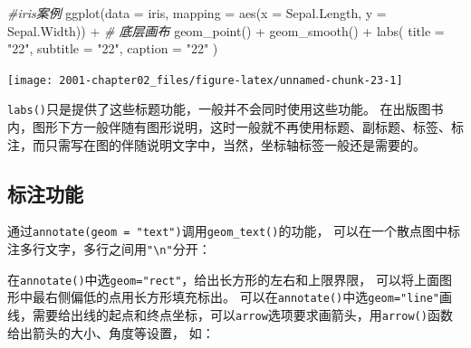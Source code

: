 \documentclass[
]{book}
\newenvironment{Shaded}{\begin{snugshade}}{\end{snugshade}}
\newcommand{\AttributeTok}[1]{\textcolor[rgb]{0.77,0.63,0.00}{#1}}
\newcommand{\CommentTok}[1]{\textcolor[rgb]{0.56,0.35,0.01}{\textit{#1}}}
\newcommand{\FunctionTok}[1]{\textcolor[rgb]{0.00,0.00,0.00}{#1}}
\newcommand{\NormalTok}[1]{#1}
\newcommand{\SpecialCharTok}[1]{\textcolor[rgb]{0.00,0.00,0.00}{#1}}
\newcommand{\StringTok}[1]{\textcolor[rgb]{0.31,0.60,0.02}{#1}}
\begin{document}
\begin{Shaded}
\begin{Highlighting}[]
\CommentTok{\#iris案例}
\FunctionTok{ggplot}\NormalTok{(}\AttributeTok{data =}\NormalTok{ iris, }\AttributeTok{mapping =} \FunctionTok{aes}\NormalTok{(}\AttributeTok{x =}\NormalTok{ Sepal.Length, }\AttributeTok{y =}\NormalTok{ Sepal.Width)) }\SpecialCharTok{+}  \CommentTok{\# 底层画布}
  \FunctionTok{geom\_point}\NormalTok{() }\SpecialCharTok{+}
  \FunctionTok{geom\_smooth}\NormalTok{() }\SpecialCharTok{+}
  \FunctionTok{labs}\NormalTok{(}
    \AttributeTok{title =} \StringTok{"22"}\NormalTok{,}
    \AttributeTok{subtitle =} \StringTok{"22"}\NormalTok{,}
    \AttributeTok{caption =} \StringTok{"22"}
\NormalTok{  )}
\end{Highlighting}
\end{Shaded}

\begin{center}\texttt{[image: 2001-chapter02\_files/figure-latex/unnamed-chunk-23-1]} \end{center}

\texttt{labs()}只是提供了这些标题功能，一般并不会同时使用这些功能。
在出版图书内，图形下方一般伴随有图形说明，这时一般就不再使用标题、副标题、标签、标注，而只需写在图的伴随说明文字中，当然，坐标轴标签一般还是需要的。

\hypertarget{ux6807ux6ce8ux529fux80fd}{%
\subsection{标注功能}\label{ux6807ux6ce8ux529fux80fd}}

通过\texttt{annotate(geom\ =\ "text")}调用\texttt{geom\_text()}的功能，
可以在一个散点图中标注多行文字，多行之间用\texttt{"\textbackslash{}n"}分开：

在\texttt{annotate()}中选\texttt{geom="rect"}，给出长方形的左右和上限界限，
可以将上面图形中最右侧偏低的点用长方形填充标出。
可以在\texttt{annotate()}中选\texttt{geom="line"}画线，需要给出线的起点和终点坐标，可以\texttt{arrow}选项要求画箭头，用\texttt{arrow()}函数给出箭头的大小、角度等设置，
如：
\end{document}
